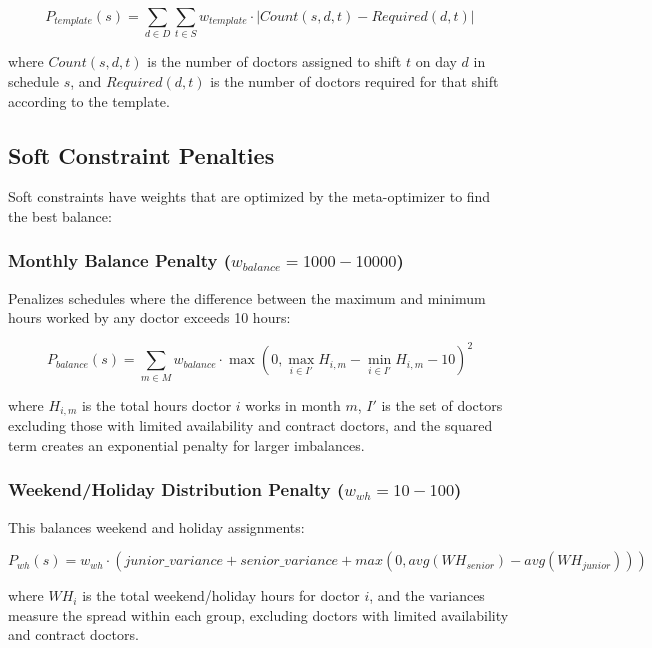 \documentclass[12pt]{article}
\begin{document}
\begin{equation}
P_{template}(s) = \sum_{d \in D} \sum_{t \in S} w_{template} \cdot |Count(s,d,t) - Required(d,t)|
\end{equation}

where $Count(s,d,t)$ is the number of doctors assigned to shift $t$ on day $d$ in schedule $s$, and $Required(d,t)$ is the number of doctors required for that shift according to the template.

\subsection{Soft Constraint Penalties}

Soft constraints have weights that are optimized by the meta-optimizer to find the best balance:

\subsubsection{Monthly Balance Penalty ($w_{balance} = 1000-10000$)}
Penalizes schedules where the difference between the maximum and minimum hours worked by any doctor exceeds 10 hours:

\begin{equation}
P_{balance}(s) = \sum_{m \in M} w_{balance} \cdot \max(0, \max_{i \in I'} H_{i,m} - \min_{i \in I'} H_{i,m} - 10)^2
\end{equation}

where $H_{i,m}$ is the total hours doctor $i$ works in month $m$, $I'$ is the set of doctors excluding those with limited availability and contract doctors, and the squared term creates an exponential penalty for larger imbalances.

\subsubsection{Weekend/Holiday Distribution Penalty ($w_{wh} = 10-100$)}
This balances weekend and holiday assignments:

\begin{equation}
P_{wh}(s) = w_{wh} \cdot (junior\_variance + senior\_variance + max(0, avg(WH_{senior}) - avg(WH_{junior})))
\end{equation}

where $WH_i$ is the total weekend/holiday hours for doctor $i$, and the variances measure the spread within each group, excluding doctors with limited availability and contract doctors.
\end{document}
